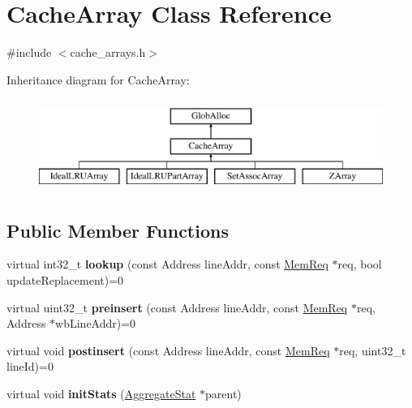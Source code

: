 \hypertarget{classCacheArray}{\section{Cache\-Array Class Reference}
\label{classCacheArray}
}


{\ttfamily \#include $<$cache\-\_\-arrays.\-h$>$}

Inheritance diagram for Cache\-Array\-:\begin{figure}[H]
\begin{center}
\leavevmode
\includegraphics[height=3.000000cm]{classCacheArray}
\end{center}
\end{figure}
\subsection*{Public Member Functions}
\begin{DoxyCompactItemize}
\item 
\hypertarget{classCacheArray_a2c638cb1d7a7899dd00a22b07327f598}{virtual int32\-\_\-t {\bfseries lookup} (const Address line\-Addr, const \hyperlink{structMemReq}{Mem\-Req} $\ast$req, bool update\-Replacement)=0}\label{classCacheArray_a2c638cb1d7a7899dd00a22b07327f598}

\item 
\hypertarget{classCacheArray_acf1528a7fbf12c7cc339353372ab8f2e}{virtual uint32\-\_\-t {\bfseries preinsert} (const Address line\-Addr, const \hyperlink{structMemReq}{Mem\-Req} $\ast$req, Address $\ast$wb\-Line\-Addr)=0}\label{classCacheArray_acf1528a7fbf12c7cc339353372ab8f2e}

\item 
\hypertarget{classCacheArray_ace44aa583ab1e84f9fe778d8b6ad8ce2}{virtual void {\bfseries postinsert} (const Address line\-Addr, const \hyperlink{structMemReq}{Mem\-Req} $\ast$req, uint32\-\_\-t line\-Id)=0}\label{classCacheArray_ace44aa583ab1e84f9fe778d8b6ad8ce2}

\item 
\hypertarget{classCacheArray_aca28881799337dc402d29d491e24efdb}{virtual void {\bfseries init\-Stats} (\hyperlink{classAggregateStat}{Aggregate\-Stat} $\ast$parent)}\label{classCacheArray_aca28881799337dc402d29d491e24efdb}

\end{DoxyCompactItemize}


